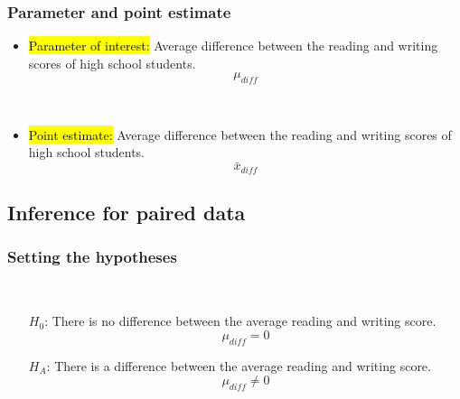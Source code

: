 
\begin{frame}
\frametitle{Parameter and point estimate}

\begin{itemize}

\item \hl{Parameter of interest:} Average difference between the reading and writing scores of  high school students.
\[ \mu_{diff} \]

$\:$ \\

\pause

\item \hl{Point estimate:} Average difference between the reading and writing scores of  high school students.
\[ \bar{x}_{diff} \]

\end{itemize}

\end{frame}


\subsection{Inference for paired data}

\begin{frame}
\frametitle{Setting the hypotheses}


\pause


$\:$ \\

\pause


\pause

\begin{itemize}
\item[$H_0$:] There is no difference between the average reading and writing score. 
\[ \mu_{diff} = 0 \]
\item[$H_A$:] There is a difference between the average reading and writing score. 
\[ \mu_{diff} \ne 0 \]
\end{itemize}

\end{frame}

